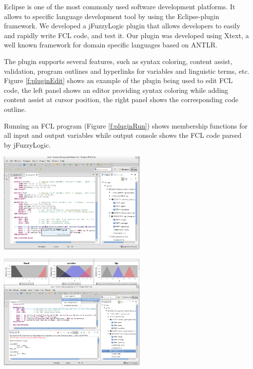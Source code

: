 \documentclass[11pt,twoside]{article}
\begin{document}
\begin{multicols}{2}
Eclipse is one of the most commonly used software development platforms.
It allows to specific language development tool by using the Eclipse-plugin framework.
We developed a jFuzzyLogic plugin that allows developers to easily and rapidly write FCL code, and test it.
Our plugin was developed using Xtext, a well known framework for domain specific languages based on ANTLR.

The plugin supports several features, such as syntax coloring, content assist, validation, program outlines and hyperlinks for variables and linguistic terms, etc.
Figure \ref{f:pluginEdit} shows an example of the plugin being used to edit FCL code, the left panel shows an editor providing syntax coloring while adding content assist at cursor position, the right panel shows the corresponding code outline. 

Running an FCL program (Figure \ref{f:pluginRun}) shows membership functions for all input and output variables while output console shows the FCL code parsed by jFuzzyLogic.

\vspace*{10pt}
\centerline{\includegraphics[width=2.9in]{./figs/plugin_edit}}
\vspace*{10pt}
\label{f:pluginEdit}
\vspace*{10pt}

\vspace*{10pt}
\centerline{\includegraphics[width=2.9in]{./figs/plugin_run}}
\vspace*{10pt}
\label{f:pluginRun}
\vspace*{10pt}



\end{multicols}
\end{document}
